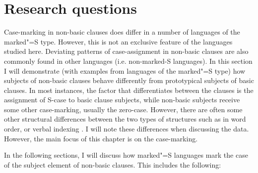 


\section{Research questions}\label{QueNonBasic}

Case-marking in non-basic clauses does differ in a number of languages of the marked"=S type.
However, this is not an exclusive feature of the languages studied here.
Deviating patterns of case-assignment in non-basic clauses are also commonly found in other languages (i.e. non-marked-S languages).
In this section I will demonstrate (with examples from languages of the marked"=S type) how subjects of non-basic clauses behave differently from prototypical subjects of basic clauses. 
In most instances, the factor that differentiates between the clauses is the assignment of S-case to basic clause subjects, while non-basic subjects receive some other case-marking, usually the zero-case. 
However, there are often some other structural differences between the two types of structures such as in word order, or verbal indexing . 
I will note these differences when discussing the data. 
However, the main focus of this chapter is on the case-marking. 

In the following sections, I will discuss how marked"=S languages mark the case of the subject element of non-basic clauses. 
This includes the following: 

